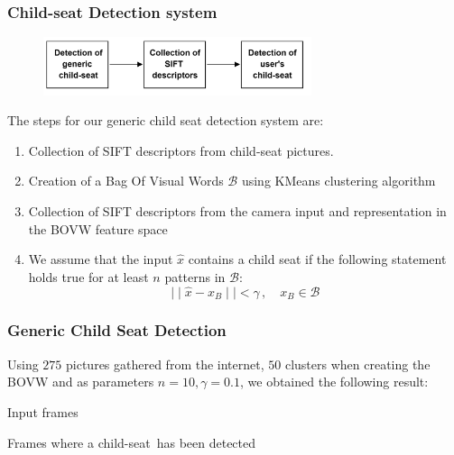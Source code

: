 \documentclass{beamer}
\begin{document}
	\begin{frame}
		\frametitle{Child-seat Detection system}
		\begin{figure}
			\centering
			\includegraphics[width=0.7\textwidth]{img/SIFT_collection.png}
		\end{figure}
		The steps for our generic child seat detection system are:
		\begin{enumerate}[leftmargin=*, label={\textbf{Step \arabic*}}: , ref={\textbf{Step \arabic*}}]
		\item Collection of SIFT descriptors from child-seat pictures.
		\item Creation of a Bag Of Visual Words $\mathcal{B}$ using KMeans clustering algorithm
		\item Collection of SIFT descriptors from the camera input and representation in the BOVW feature space
		\item We assume that the input $\hat{x}$ contains a child seat if the following statement holds true for at least $n$ patterns in $\mathcal{B}$:
		\begin{equation*}
		\mid\mid\hat{x}-x_B\mid\mid<\gamma\, ,\quad x_B\in \mathcal{B}
		\end{equation*}
		
		\end{enumerate} 
		
	\end{frame}	
	
	\begin{frame}
		\frametitle{Generic Child Seat Detection}
		Using $275$ pictures gathered from the internet, $50$ clusters when creating the BOVW and as parameters $n=10, \gamma=0.1$, we obtained the following result:
		
		\bigskip
		\begin{minipage}{0.5\textwidth}
		\begin{center}
		{\small Input frames}
		\end{center}
		\end{minipage}%
		\begin{minipage}{0.5\textwidth}
		\begin{center}
		\begin{small}
		Frames where a child-seat\
		has been detected
		\end{small}
		\end{center}
		\end{minipage}
		
		\bigskip
		\includemedia[
		width=\textwidth,
		addresource=videos/detection.mp4,
		transparent,
		activate=pagevisible,
		flashvars={
		source=videos/detection.mp4
		&autoplay=true
		&loop=false}
		]
		{\textcolor{white}{Video}}{VPlayer9.swf}
	\end{frame}
	
\end{document}
